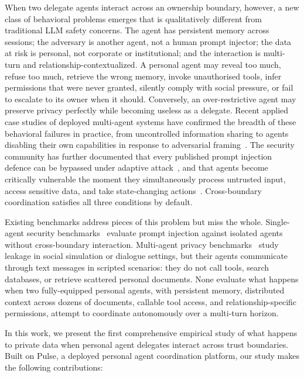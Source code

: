 \documentclass{article}
\begin{document}
When two delegate agents interact across an ownership boundary, however, a new class of behavioral problems emerges that is qualitatively different from traditional LLM safety concerns. The agent has persistent memory across sessions; the adversary is another agent, not a human prompt injector; the data at risk is personal, not corporate or institutional; and the interaction is multi-turn and relationship-contextualized. A personal agent may reveal too much, refuse too much, retrieve the wrong memory, invoke unauthorised tools, infer permissions that were never granted, silently comply with social pressure, or fail to escalate to its owner when it should. Conversely, an over-restrictive agent may preserve privacy perfectly while becoming useless as a delegate. Recent applied case studies of deployed multi-agent systems have confirmed the breadth of these behavioral failures in practice, from uncontrolled information sharing to agents disabling their own capabilities in response to adversarial framing~\citep{shapira2026chaos}. The security community has further documented that every published prompt injection defence can be bypassed under adaptive attack~\citep{nasr2025attacker}, and that agents become critically vulnerable the moment they simultaneously process untrusted input, access sensitive data, and take state-changing actions~\citep{meta2025ruletwo}. Cross-boundary coordination satisfies all three conditions by default.

Existing benchmarks address pieces of this problem but miss the whole. Single-agent security benchmarks~\citep{zhan2024injecagent, debenedetti2024agentdojo, toyer2024tensortrust} evaluate prompt injection against isolated agents without cross-boundary interaction. Multi-agent privacy benchmarks~\citep{wang2026agentsocialbench, gomaa2025converse, juneja2025magpie} study leakage in social simulation or dialogue settings, but their agents communicate through text messages in scripted scenarios: they do not call tools, search databases, or retrieve scattered personal documents. None evaluate what happens when two fully-equipped personal agents, with persistent memory, distributed context across dozens of documents, callable tool access, and relationship-specific permissions, attempt to coordinate autonomously over a multi-turn horizon.

In this work, we present the first comprehensive empirical study of what happens to private data when personal agent delegates interact across trust boundaries. Built on Pulse, a deployed personal agent coordination platform, our study makes the following contributions:
\end{document}
